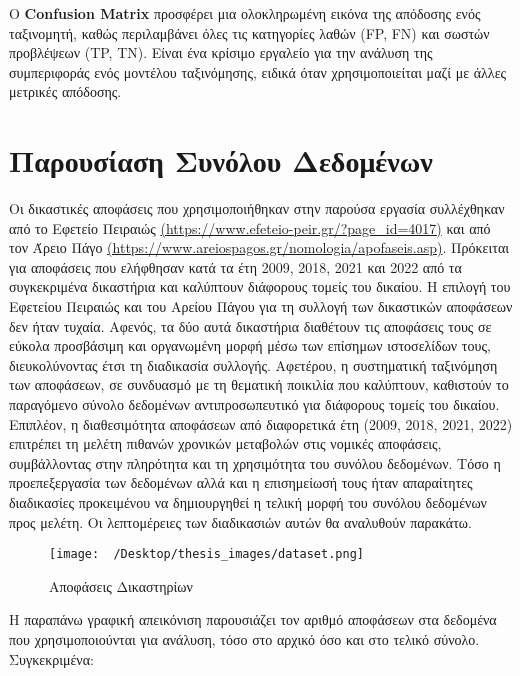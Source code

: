 \documentclass[diploma]{softlab-thesis}
\begin{document}
Ο \textbf{Confusion Matrix} προσφέρει μια ολοκληρωμένη εικόνα της απόδοσης ενός ταξινομητή, καθώς περιλαμβάνει όλες τις κατηγορίες λαθών (FP, FN) και σωστών προβλέψεων (TP, TN). Είναι ένα κρίσιμο εργαλείο για την ανάλυση της συμπεριφοράς ενός μοντέλου ταξινόμησης, ειδικά όταν χρησιμοποιείται μαζί με άλλες μετρικές απόδοσης.



\chapter{Παρουσίαση Συνόλου Δεδομένων}

\sloppy
Οι δικαστικές αποφάσεις που χρησιμοποιήθηκαν στην παρούσα εργασία συλλέχθηκαν από το Εφετείο Πειραιώς \href{https://www.efeteio-peir.gr/?page\_id=4017}{(https://www.efeteio-peir.gr/?page\_id=4017)} και από τον Άρειο Πάγο \href{https://www.areiospagos.gr/nomologia/apofaseis.asp}{(https://www.areiospagos.gr/nomologia/apofaseis.asp)}. 
Πρόκειται για αποφάσεις που ελήφθησαν κατά τα έτη 2009, 2018, 2021 και 2022 από τα συγκεκριμένα δικαστήρια και καλύπτουν διάφορους τομείς του δικαίου. 
Η επιλογή του Εφετείου Πειραιώς και του Αρείου Πάγου για τη συλλογή των δικαστικών αποφάσεων δεν ήταν τυχαία. Αφενός, τα δύο αυτά δικαστήρια διαθέτουν τις αποφάσεις τους σε εύκολα προσβάσιμη και οργανωμένη μορφή μέσω των επίσημων ιστοσελίδων τους, διευκολύνοντας έτσι τη διαδικασία συλλογής. Αφετέρου, η συστηματική ταξινόμηση των αποφάσεων, σε συνδυασμό με τη θεματική ποικιλία που καλύπτουν, καθιστούν το παραγόμενο σύνολο δεδομένων αντιπροσωπευτικό για διάφορους τομείς του δικαίου. 
Επιπλέον, η διαθεσιμότητα αποφάσεων από διαφορετικά έτη (2009, 2018, 2021, 2022) επιτρέπει τη μελέτη πιθανών χρονικών μεταβολών στις νομικές αποφάσεις, συμβάλλοντας στην πληρότητα και τη χρησιμότητα του συνόλου δεδομένων. Τόσο η προεπεξεργασία των δεδομένων αλλά και η επισημείωσή τους ήταν απαραίτητες διαδικασίες προκειμένου να δημιουργηθεί η τελική μορφή του συνόλου δεδομένων προς μελέτη. Οι λεπτομέρειες των διαδικασιών αυτών θα αναλυθούν παρακάτω.
\vspace{1cm}

\begin{figure}[h]
    \centering
    \texttt{[image: ~/Desktop/thesis\_images/dataset.png]} %
    \caption{Αποφάσεις Δικαστηρίων}
    \label{fig:your_image_label}
\end{figure}

Η παραπάνω γραφική απεικόνιση παρουσιάζει τον αριθμό αποφάσεων στα δεδομένα που χρησιμοποιούνται για ανάλυση, τόσο στο αρχικό όσο και στο τελικό σύνολο. Συγκεκριμένα:
\end{document}
